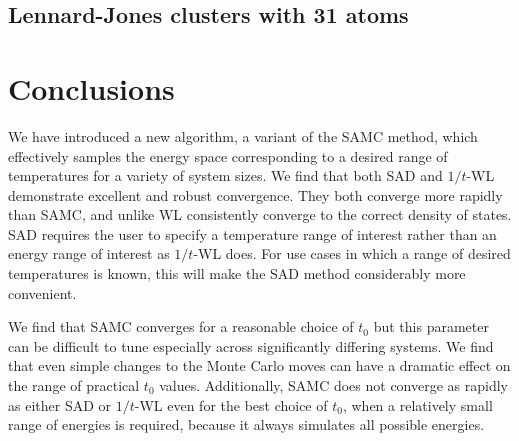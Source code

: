 \documentclass[letterpaper,twocolumn,amsmath,amssymb,pre,aps,10pt]{revtex4-1}
\begin{document}
\subsection{Lennard-Jones clusters with 31 atoms}

\section{Conclusions}
We have introduced a new algorithm, a variant of the SAMC method, which
effectively samples the
energy space corresponding to a desired range of temperatures for a
variety of system sizes.
%
We find that both SAD and $1/t$-WL demonstrate excellent and robust
convergence.
They both converge more rapidly than SAMC, and unlike WL consistently
converge to the correct density of states. SAD requires
the user to specify a temperature range of interest rather than an
energy range of interest as $1/t$-WL does.  For use cases in which
a range of desired temperatures is known, this will make the SAD method
considerably more convenient.

We find that SAMC converges for a reasonable choice of
$t_0$ but this parameter can be difficult to tune especially across
significantly differing systems.  We find that even simple
changes to the Monte Carlo moves can have a dramatic effect on the
range of practical $t_0$ values.  Additionally, SAMC does not
converge as rapidly as either SAD or $1/t$-WL even for the best choice of $t_0$,
when a relatively small range of energies is required, because it always
simulates all possible energies.




\end{document}
